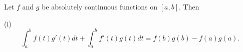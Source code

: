 Let $f$ and $g$ be absolutely continuous functions on $[a, b]$. Then

(i) $$\int_a^b f(t) g'(t) dt + \int_a^b f'(t) g(t) dt = f(b) g(b) - f(a) g(a).$$